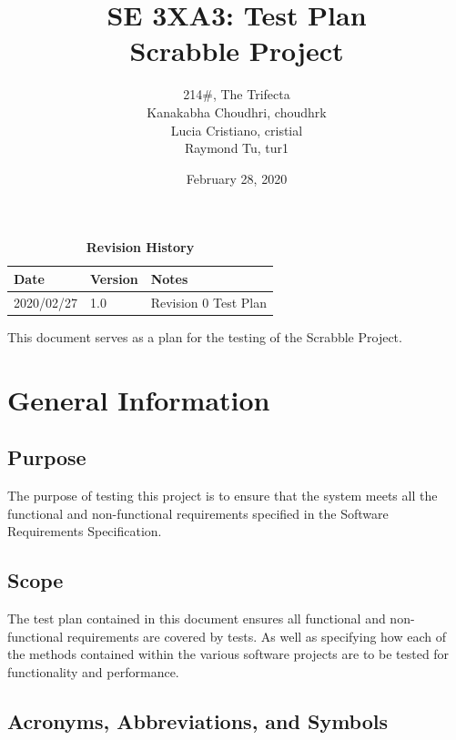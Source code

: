 \documentclass[12pt, titlepage]{article}
\title{SE 3XA3: Test Plan\\Scrabble Project}
\author{214\#, The Trifecta
		\\ Kanakabha Choudhri, choudhrk
		\\ Lucia Cristiano, cristial
		\\ Raymond Tu, tur1
}
\date{February 28, 2020}
\begin{document}
\maketitle

\tableofcontents
\listoftables
\listoffigures

\begin{table}[bp]
\caption{\bf Revision History}
\begin{tabularx}{\textwidth}{p{3cm}p{2cm}X}
\toprule {\bf Date} & {\bf Version} & {\bf Notes}\\
\midrule
2020/02/27 & 1.0 & Revision 0 Test Plan\\
\bottomrule
\end{tabularx}
\end{table}

\newpage


This document serves as a plan for the testing of the Scrabble Project.

\section{General Information} 

\subsection{Purpose}

The purpose of testing this project is to ensure that the system meets all the functional and non-functional requirements specified in the Software Requirements Specification.

\subsection{Scope}

The test plan contained in this document ensures all  functional and non-functional requirements are covered by tests. As well as specifying how each of the methods contained within the various software projects are to be tested for functionality and performance.

\subsection{Acronyms, Abbreviations, and Symbols}
	
\end{document}
